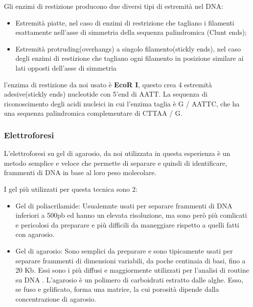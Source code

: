 \documentclass{article}
\begin{document}
Gli enzimi di restizione producono due diversi tipi di estremità nel DNA:
\begin{itemize}

\item Estremità piatte, nel caso di enzimi di restrizione che tagliano i filamenti esattamente nell'asse di simmetria della sequenza palindromica (Clunt ends);
\item Estremità protruding(overhangs) a singolo filamento(stickly ends), nel caso degli enzimi di restizione che tagliano ogni filamento in posizione similare ai lati opposti dell'asse di simmetria

\end{itemize}

l'enzima di restizione da noi usato è \textbf{EcoR I}, questo crea 4 estremità adesive(stickly ends) nucleotide con  5'end  di AATT. La sequenza di riconoscimento degli acidi nucleici in cui l'enzima taglia è G / ​​AATTC, che ha una sequenza palindromica complementare di CTTAA / G.

\subsubsection{Elettroforesi}

L'elettroforesi su gel di agarosio, da noi utilizzata in questa esperienza è un metodo semplice e veloce che permette di separare e quindi di identificare, frammenti di DNA in base al loro peso molecolare.

I gel più utilizzati per questa tecnica sono 2: 
\begin{itemize}

\item{Gel di poliacrilamide: } Usualemnte usati per separare frammenti di DNA inferiori a 500pb ed hanno un elevata risoluzione, ma sono però più comlicati e pericolosi da preparare e più difficili da maneggiare rispetto a quelli fatti con agarosio.  

\item{Gel di agarosio: } Sono semplici da preparare e sono tipicamente usati per separare frammenti di dimensioni variabili, da poche centinaia di basi, fino a 20 Kb. Essi sono i più diffusi e maggiormente utilizzati per l'analisi di routine su DNA .  L'agarosio è un polimero di carboidrati estratto dalle alghe. Esso, se fuso e gelificato, forma una matrice, la cui porosità dipende dalla concentrazione di agarosio.

\end{itemize}
\end{document}
